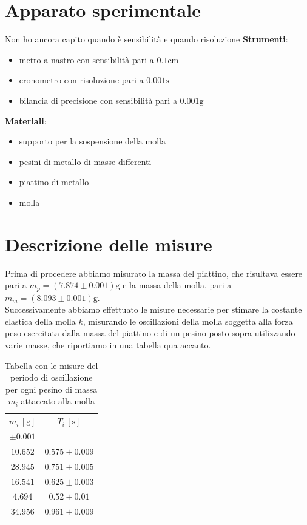 \documentclass{article}
\begin{document}
\section{Apparato sperimentale}
Non ho ancora capito quando è sensibilità e quando risoluzione
\textbf{Strumenti}:
\begin{itemize}
	\item metro a nastro con sensibilità pari a $0.1 \si{\centi\meter}$
	\item cronometro con risoluzione pari a $0.001 \si{\second}$
	\item bilancia di precisione con sensibilità pari a $0.001 \si{\gram}$
\end{itemize}		
\textbf{Materiali}:
\begin{itemize}
	\item supporto per la sospensione della molla
	\item pesini di metallo di masse differenti
	\item piattino di metallo
	\item molla
\end{itemize}

\section{Descrizione delle misure}
Prima di procedere abbiamo misurato la massa del piattino, che risultava essere pari a $m_p = (7.874 \pm 0.001) \si{\gram}$ e la massa della molla, pari a $m_m = (8.093 \pm 0.001) \si{\gram}$. \\
Successivamente abbiamo effettuato le misure necessarie per stimare la costante elastica della molla $k$, misurando le oscillazioni della molla soggetta alla forza peso esercitata dalla massa del piattino e di un pesino posto sopra utilizzando varie masse, che riportiamo in una tabella qua accanto. \\

\begin{table}
	\centering
	\begin{tabular}{c c}
	\toprule
	$m_i \, [\si{\gram}]$ & $T_i \, [\si{\second}]$ \\
	$\pm 0.001$ &  \\
	\midrule
	$10.652$ & $0.575 \pm 0.009$ \\
	$28.945$ & $0.751 \pm 0.005$ \\
	$16.541$ & $0.625 \pm 0.003$ \\
	$4.694$ & $0.52 \pm 0.01$ \\
	$34.956$ & $0.961 \pm 0.009$ \\
	\bottomrule		
	\end{tabular}
	\caption{Tabella con le misure del periodo di oscillazione per ogni pesino di massa $m_i$ attaccato alla molla}
\end{table}
\end{document}
